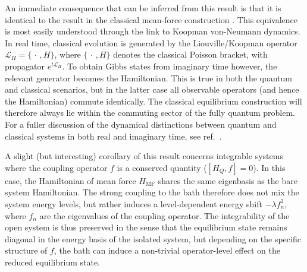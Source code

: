 \documentclass[aps,prl,twocolumn,superscriptaddress,showpacs,floatfix]{revtex4-2}
\begin{document}
An immediate consequence that can be inferred from this result is that it is identical to the result in the classical mean-force construction
\cite{campisiTalknerHanggi2009Solvable,talknerColloquiumStatisticalMechanics2020,cerisolaQuantumClassicalCorrespondence2024}. This equivalence is most easily understood through the link to Koopman von-Neumann dynamics. In real time, classical evolution is generated by the Liouville/Koopman operator $\mathcal L_H=\{\,\cdot\,,H\}$, where $\{\,\cdot\,,H\}$ denotes the classical Poisson bracket, with propagator $e^{t\mathcal L_H}$. To obtain Gibbs states from imaginary time however, the relevant generator becomes the Hamiltonian. This is true in both the quantum and classical scenarios, but in the latter case all observable operators (and hence the Hamiltonian) commute identically. The classical equilibrium construction will therefore always lie within the commuting sector of the fully quantum problem. For a fuller discussion of the dynamical distinctions between quantum and classical systems in both real and imaginary time, see ref.~\cite{McCaulZhdanovBondar2023WaveOperator}.

A slight (but interesting) corollary of this result concerns integrable systems where the coupling operator $f$ is a conserved quantity ($[H_Q, f]=0$). In this case, the Hamiltonian of mean force $H_{\mathrm{MF}}$ shares the same eigenbasis as the bare system Hamiltonian. The strong coupling to the bath therefore does not mix the system energy levels, but rather induces a level-dependent energy shift $-\lambda f_n^2$, where $f_n$ are the eigenvalues of the coupling operator. The integrability of the open system is thus preserved in the sense that the equilibrium state remains diagonal in the energy basis of the isolated system, but depending on the specific structure of $f$, the bath can induce a non-trivial operator-level effect on the reduced equilibrium state. 
\end{document}
